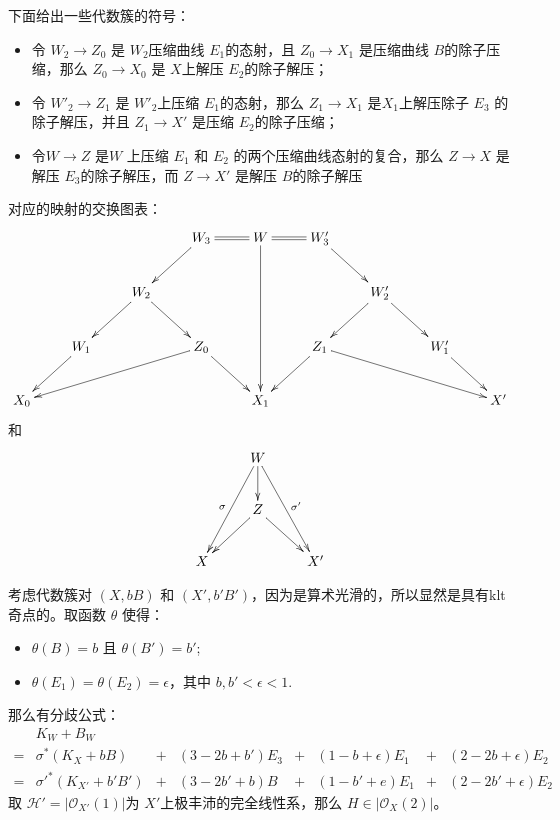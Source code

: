 下面给出一些代数簇的符号：
\begin{itemize}
  \item 令 $W_{2}\to Z_{0}$ 是  $W_{2}$压缩曲线 $E_{1}$的态射，且 $Z_{0} \to X_{1}$ 是压缩曲线 $B$的除子压缩，那么 $Z_{0}\to X_{0}$ 是  $X$上解压 $E_{2}$的除子解压；
  \item 令 $W'_{2}\to Z_{1}$   是 $W'_{2}$上压缩 $E_{1}$的态射，那么 $Z_{1} \to X_{1}$ 是$X_{1}$上解压除子 $E_{3}$ 的除子解压，并且 $Z_{1}\to X'$ 是压缩 $E_{2}$的除子压缩；
  \item 令$W\to Z$ 是$W$ 上压缩  $E_{1}$ 和 $E_{2}$ 的两个压缩曲线态射的复合，那么 $Z\to X$ 是解压 $E_{3}$的除子解压，而 $Z\to X'$ 是解压 $B$的除子解压
\end{itemize}
对应的映射的交换图表：
\[ \xymatrix{&&&W_3\ar[ld]\ar@{=}[r]&W\ar[ddd]\ar@{=}[r]&W_3'\ar[rd]\\
    &&W_2\ar[ld]\ar[rd]&&&&W_2'\ar[rd]\ar[dl]\\
    &W_1\ar[ld]&&Z_0\ar[llld]\ar[rd]&&Z_1\ar[ld]\ar[rrrd]&&W_1'\ar[rd]\\
    X_0&&&&X_1&&&&X'
  } \]
  和
\[\xymatrix{
    &W\ar[d]\ar[ddl]_{\sigma}\ar[ddr]^{\sigma'}&\\
    &Z\ar[dl]\ar[dr]\\
    X&&X' }  \]

考虑代数簇对 $ (X,bB) $ 和 $ (X',b'B') $，因为是算术光滑的，所以显然是具有klt奇点的。取函数 $\theta$ 使得：
\begin{itemize}
  \item $\theta(B)=b$ 且 $\theta(B')=b'$;
  \item $\theta(E_{1})=\theta(E_{2})=\epsilon$，其中 $b,b'<\epsilon<1$.
\end{itemize}
那么有分歧公式：
\[ \begin{array}{rllllllll}
      & K_W+B_W \\
    = & \sigma^*(K_X+bB)       & + & (3-2b+b')E_3 & + & (1-b+\epsilon)E_1 & + & (2-2b+\epsilon)E_2  & \\
    = & \sigma'^*(K_{X'}+b'B') & + & (3-2b'+b)B   & + & (1-b'+e)E_1       & + & (2-2b'+\epsilon)E_2 &
  \end{array} \]
取 $ \mathcal{H}'=|\mathcal{O}_{X'}(1)| $为 $X'$上极丰沛的完全线性系，那么 $H\in |\mathcal{O}_{X}(2)|$。

